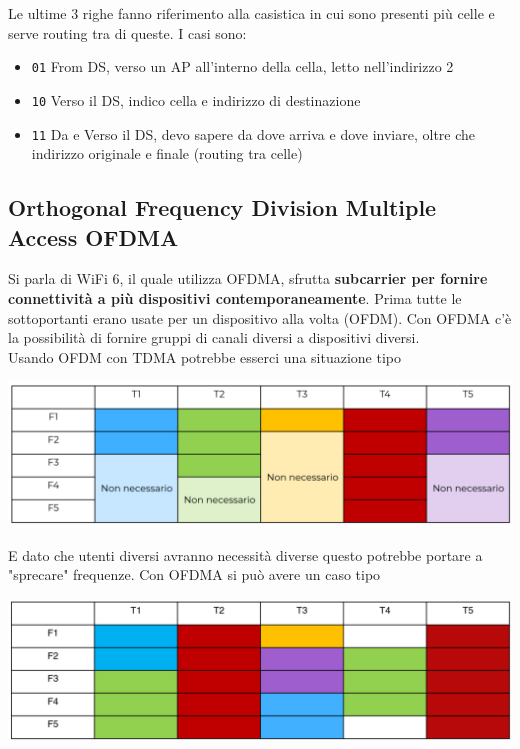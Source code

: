 \newpage

Le ultime 3 righe fanno riferimento alla casistica in cui sono presenti più celle e serve routing tra di queste. I casi sono:
\begin{itemize}
	\item \texttt{01} From DS, verso un AP all'interno della cella, letto nell'indirizzo 2
	\item \texttt{10} Verso il DS, indico cella e indirizzo di destinazione
	\item \texttt{11} Da e Verso il DS, devo sapere da dove arriva e dove inviare, oltre che indirizzo originale e finale (routing tra celle)
\end{itemize}

\subsection{Orthogonal Frequency Division Multiple Access OFDMA}

Si parla di WiFi 6, il quale utilizza OFDMA, sfrutta \textbf{subcarrier per fornire connettività a più dispositivi contemporaneamente}. Prima tutte le sottoportanti erano usate per un dispositivo alla volta (OFDM). Con OFDMA c'è la possibilità di fornire gruppi di canali diversi a dispositivi diversi. \\

Usando OFDM con TDMA potrebbe esserci una situazione tipo
\begin{center}
	\includegraphics[width=0.75\linewidth]{img/wlan/tab1}
\end{center}

E dato che utenti diversi avranno necessità diverse questo potrebbe portare a "sprecare" frequenze. Con OFDMA si può avere un caso tipo
\begin{center}
	\includegraphics[width=0.75\linewidth]{img/wlan/tab2}
\end{center}

